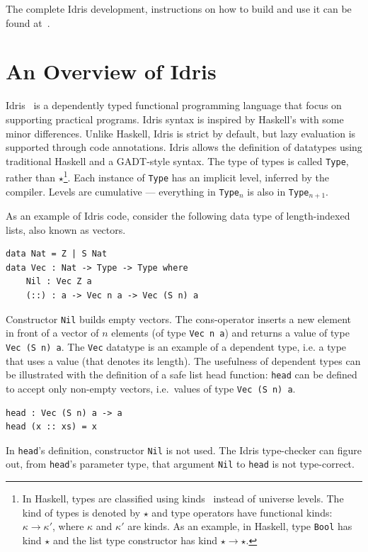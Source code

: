 \documentclass{llncs}
\newcommand{\idris}[1]{\texttt{#1}}%
\newcommand{\haskell}[1]{\texttt{#1}}%
\begin{document}
The complete Idris development, instructions on how to build and use
it can be found at~\cite{regex-rep}.

\section{An Overview of Idris}\label{sec:idris}

Idris~\cite{Brady2013} is a dependently typed functional programming
language that focus on supporting practical programs. Idris syntax is
inspired by Haskell’s with some minor differences. Unlike Haskell,
Idris is strict by default, but lazy evaluation is supported through
code annotations. Idris allows the definition of datatypes using
traditional Haskell and a GADT-style syntax.  The type of types is
called \idris{Type}, rather than $\star$\footnote{In Haskell, types
  are classified using kinds~\cite{Pierce2002} instead of universe
  levels. The kind of types is denoted by $\star$ and type operators
  have functional kinds: $\kappa\to\kappa'$, where $\kappa$ and
  $\kappa'$ are kinds. As an example, in Haskell, type \haskell{Bool}
  has kind $\star$ and the list type constructor has kind
  $\star\to\star$.}. Each instance of \idris{Type} has an implicit
level, inferred by the compiler. Levels are cumulative --- everything
in \idris{Type}$_n$ is also in \idris{Type}$_{n+1}$.

As an example of Idris code, consider the following data type of
length-indexed lists, also known as vectors.
\begin{verbatim}
data Nat = Z | S Nat
data Vec : Nat -> Type -> Type where
    Nil : Vec Z a
    (::) : a -> Vec n a -> Vec (S n) a
\end{verbatim}
Constructor \idris{Nil} builds empty vectors. The cons-operator
inserts a new element in front of a vector of $n$ elements (of type
\idris{Vec n a}) and returns a value of type \idris{Vec (S n) a}. The
\idris{Vec} datatype is an example of a dependent type, i.e. a type
that uses a value (that denotes its length). The usefulness of
dependent types can be illustrated with the definition of a safe list
head function: \idris{head} can be defined to accept only non-empty
vectors, i.e.~values of type \idris{Vec (S n) a}.
\begin{verbatim}
head : Vec (S n) a -> a
head (x :: xs) = x
\end{verbatim}
In \idris{head}'s definition, constructor \idris{Nil} is not used. The
Idris type-checker can figure out, from \idris{head}'s parameter type,
that argument \idris{Nil} to \idris{head} is not type-correct.
\end{document}
